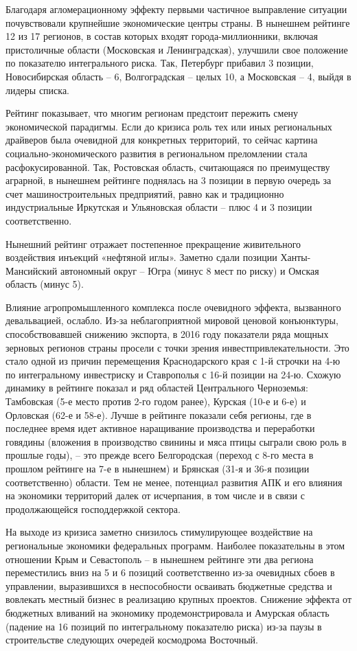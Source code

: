 Благодаря агломерационному эффекту первыми частичное выправление ситуации почувствовали крупнейшие экономические центры страны. В нынешнем рейтинге 12 из 17 регионов, в состав которых входят города-миллионники, включая пристоличные области (Московская и Ленинградская), улучшили свое положение по показателю интегрального риска. Так, Петербург прибавил 3 позиции, Новосибирская область – 6, Волгоградская – целых 10, а Московская – 4, выйдя в лидеры списка.

Рейтинг показывает, что многим регионам предстоит пережить смену экономической парадигмы. Если до кризиса роль тех или иных региональных драйверов была очевидной для конкретных территорий, то сейчас картина социально-экономического развития в региональном преломлении стала расфокусированной. Так, Ростовская область, считающаяся по преимуществу аграрной, в нынешнем рейтинге поднялась на 3 позиции в первую очередь за счет машиностроительных предприятий, равно как и традиционно индустриальные Иркутская и Ульяновская области – плюс 4 и 3 позиции соответственно.

Нынешний рейтинг отражает постепенное прекращение живительного воздействия инъекций «нефтяной иглы». Заметно сдали позиции Ханты-Мансийский автономный округ – Югра (минус 8 мест по риску) и Омская область (минус 5).

Влияние агропромышленного комплекса после очевидного эффекта, вызванного девальвацией, ослабло. Из-за неблагоприятной мировой ценовой конъюнктуры, способствовавшей снижению экспорта, в 2016 году показатели ряда мощных зерновых регионов страны просели с точки зрения инвестпривлекательности. Это стало одной из причин перемещения Краснодарского края с 1-й строчки на 4-ю по интегральному инвестриску и Ставрополья с 16-й позиции на 24-ю. Схожую динамику в рейтинге показал и ряд областей Центрального Черноземья: Тамбовская (5-е место против 2-го годом ранее), Курская (10-е и 6-е) и Орловская (62-е и 58-е). Лучше в рейтинге показали себя регионы, где в последнее время идет активное наращивание производства и переработки говядины (вложения в производство свинины и мяса птицы сыграли свою роль в прошлые годы), – это прежде всего Белгородская (переход с 8-го места в прошлом рейтинге на 7-е в нынешнем) и Брянская (31-я и 36-я позиции соответственно) области. Тем не менее, потенциал развития АПК и его влияния на экономики территорий далек от исчерпания, в том числе и в связи с продолжающейся господдержкой сектора.

На выходе из кризиса заметно снизилось стимулирующее воздействие на региональные экономики федеральных программ. Наиболее показательны в этом отношении Крым и Севастополь – в нынешнем рейтинге эти два региона переместились вниз на 5 и 6 позиций соответственно из-за очевидных сбоев в управлении, выразившихся в неспособности осваивать бюджетные средства и вовлекать местный бизнес в реализацию крупных проектов. Снижение эффекта от бюджетных вливаний на экономику продемонстрировала и Амурская область (падение на 16 позиций по интегральному показателю риска) из-за паузы в строительстве следующих очередей космодрома Восточный.

